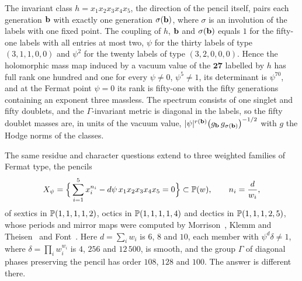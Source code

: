 \begin{theorem}\label{thm:C}
The invariant class $h=x_1x_2x_3x_4x_5$, the direction of the pencil
itself, pairs each generation $\mathbf{b}$ with exactly one generation
$\sigma(\mathbf{b})$, where $\sigma$ is an involution of the labels with one fixed
point. The coupling of $h$, $\mathbf{b}$ and $\sigma(\mathbf{b})$ equals $1$ for the
fifty-one labels with all entries at most two, $\psi$ for the thirty labels
of type $(3,1,1,0,0)$ and $\psi^2$ for the twenty labels of type
$(3,2,0,0,0)$. Hence the holomorphic mass map induced by a vacuum value of the
$\mathbf{27}$ labelled by $h$ has full rank one hundred and one for every
$\psi\ne0$, $\psi^5\ne1$, its determinant is $\psi^{70}$, and at the
Fermat point $\psi=0$ its rank is fifty-one with the fifty generations
containing an exponent three massless. The spectrum consists of one singlet
and fifty doublets, and the $\Gamma$-invariant metric is diagonal in the
labels, so the fifty doublet masses are, in units of the vacuum value,
$|\psi|^{r(\mathbf{b})}\big(g_{\mathbf{b}}\,g_{\sigma(\mathbf{b})}\big)^{-1/2}$ with $g$ the
Hodge norms of the classes.
\end{theorem}



The same residue and character questions extend to three weighted families
of Fermat type, the pencils
\begin{equation}\label{eq:wpencil}
X_\psi=\Big\{\sum_{i=1}^5x_i^{n_i}-d\psi\,x_1x_2x_3x_4x_5=0\Big\}
\subset\mathbb{P}(w),\qquad n_i=\frac{d}{w_i},
\end{equation}
of sextics in $\mathbb{P}(1,1,1,1,2)$, octics in $\mathbb{P}(1,1,1,1,4)$ and dectics in
$\mathbb{P}(1,1,1,2,5)$, whose periods and mirror maps were computed by
Morrison~\cite{Mor92}, Klemm and Theisen~\cite{KT93} and
Font~\cite{Fon93}. Here $d=\sum_iw_i$ is $6$, $8$ and $10$, each member
with $\psi^d\delta\ne1$, where $\delta=\prod_iw_i^{w_i}$ is $4$, $256$ and
$12\,500$, is smooth, and the group $\Gamma$ of diagonal phases preserving
the pencil has order $108$, $128$ and $100$. The answer is different there.

